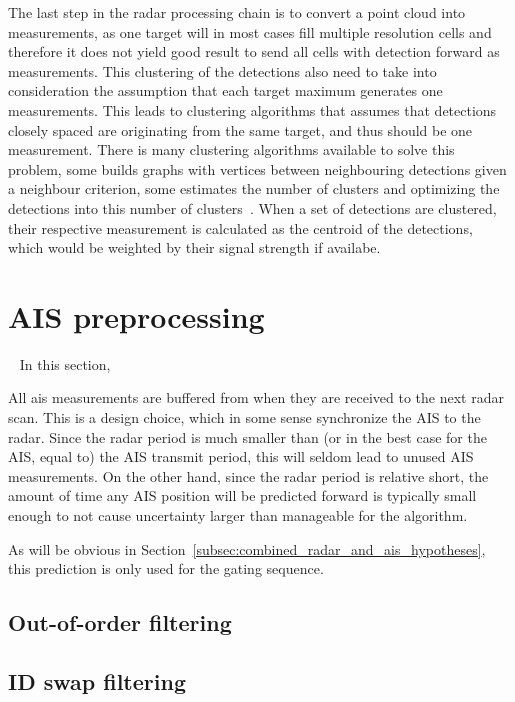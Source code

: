 The last step in the radar processing chain is to convert a point cloud into measurements, as one target will in most cases fill multiple resolution cells and therefore it does not yield good result to send all cells with detection forward as measurements. This clustering of the detections also need to take into consideration the assumption that each target maximum generates one measurements. This leads to clustering algorithms that assumes that detections closely spaced are originating from the same target, and thus should be one measurement. There is many clustering algorithms available to solve this problem, some builds graphs with vertices between neighbouring detections given a neighbour criterion, some estimates the number of clusters and optimizing the detections into this number of clusters~\cite{Mahmuddin2010,Pelleg2000}. When a set of detections are clustered, their respective measurement is calculated as the centroid of the detections, which would be weighted by their signal strength if availabe.

\section{AIS preprocessing}~\label{sec:ais_preprocessing}
In this section, 

All \gls{ais} measurements are buffered from when they are received to the next radar scan. This is a design choice, which in some sense synchronize the AIS to the radar. Since the radar period is much smaller than (or in the best case for the AIS, equal to) the AIS transmit period, this will seldom lead to unused AIS measurements. On the other hand, since the radar period is relative short, the amount of time any AIS position will be predicted forward is typically small enough to not cause uncertainty larger than manageable for the algorithm. 

As will be obvious in Section~\ref{subsec:combined_radar_and_ais_hypotheses}, this prediction is only used for the gating sequence.

\subsection{Out-of-order filtering}

\subsection{ID swap filtering}